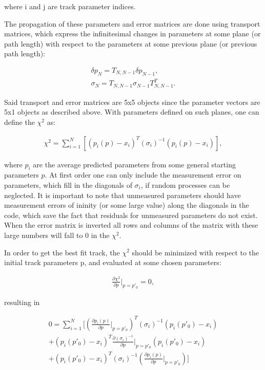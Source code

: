     where i and j are track parameter indices.

    The propagation of these parameters and error matrices are done using transport matrices, which express the infinitesimal changes in parameters at some plane (or path length) with respect to the parameters at some previous plane (or previous path length):

\begin{align} \label{eq:transport}
\delta p_{N} = T_{N,N-1} \delta p_{N-1}, \\
\sigma_{N} = T_{N,N-1} \sigma_{N-1} T_{N,N-1}^{T}.
\end{align}
 
    Said transport and error matrices are 5x5 objects since the parameter vectors are 5x1 objects as described above. With parameters defined on such planes, one can define the $\chi^{2}$ as: 

\begin{align} \label{eq:chi2sum}
\chi^2 = \sum_{i=1}^{N} [(p_{i}(p)-x_{i})^{T}(\sigma_{i})^{-1}(p_{i}(p)-x_{i})],
\end{align}

    where $p_{i}$ are the average predicted parameters from some general starting parameters $p$. At first order one can only include the measurement error on parameters, which fill in the diagonals of $\sigma_{i}$, if random processes can be neglected. It is important to note that unmeasured parameters should have measurement errors of ininity (or some large value) along the diagonals in the code, which save the fact that residuals for unmeasured parameters do not exist. When the error matrix is inverted all rows and columns of the matrix with these large numbers will fall to 0 in the $\chi^{2}$. 

    In order to get the best fit track, the $\chi^{2}$ should be minimized with respect to the initial track parameters p, and evaluated at some chosen parameters:

\begin{align} \label{eq:minimize}
\frac{\partial \chi^{2}}{\partial p}|_{p=p'_{0}} = 0,
\end{align}

    resulting in

\begin{align}
0 = \sum_{i=1}^{N}[ (\frac{\partial p_{i}(p)}{\partial p}|_{p=p'_{0}})^{T} (\sigma_{i})^{-1} (p_{i}(p'_{0})-x_{i}) \\ 
+ (p_{i}(p'_{0})-x_{i})^{T} \frac{\partial(\sigma_{i})^{-1}}{\partial p}|_{p=p'_{0}} (p_{i}(p'_{0})-x_{i}) \\ 
+  (p_{i}(p'_{0})-x_{i})^{T} (\sigma_{i})^{-1} (\frac{\partial p_{i}(p)}{\partial p}|_{p=p'_{0}})]
\end{align}

